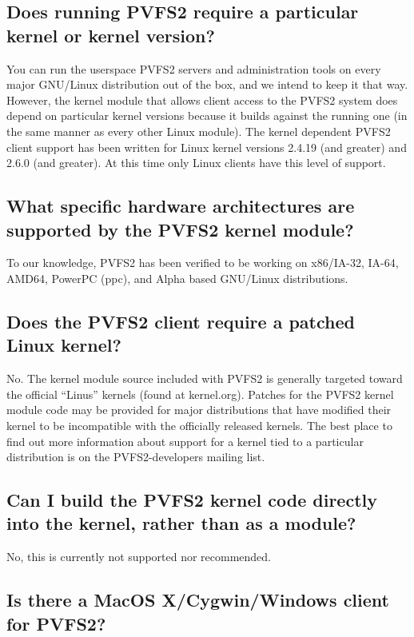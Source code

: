 \documentclass[11pt,letterpaper]{article}
\begin{document}
\subsection{Does running PVFS2 require a particular kernel or kernel
            version?}
\label{sec:kernel-version}

You can run the userspace PVFS2 servers and administration tools on
every major GNU/Linux distribution out of the box, and we intend to
keep it that way.
%
However, the kernel module that allows client access to the PVFS2 system
does depend on particular kernel versions because it builds against
the running one (in the same manner as every other Linux module).
The kernel dependent PVFS2 client support has been written for Linux
kernel versions 2.4.19 (and greater) and 2.6.0 (and greater).  At this
time only Linux clients have this level of support.

\subsection{What specific hardware architectures are supported by the
            PVFS2 kernel module?}
\label{sec:supported-hw}

To our knowledge, PVFS2 has been verified to be working on x86/IA-32,
IA-64, AMD64, PowerPC (ppc), and Alpha based GNU/Linux distributions.

\subsection{Does the PVFS2 client require a patched Linux kernel?}

No.  The kernel module source included with PVFS2 is generally
targeted toward the official ``Linus'' kernels (found at kernel.org).
Patches for the PVFS2 kernel module code may be provided for major
distributions that have modified their kernel to be incompatible with
the officially released kernels.  The best place to find out more
information about support for a kernel tied to a particular
distribution is on the PVFS2-developers mailing list.

\subsection{Can I build the PVFS2 kernel code directly into the kernel,
            rather than as a module?}

No, this is currently not supported nor recommended.

\subsection{Is there a MacOS X/Cygwin/Windows client for PVFS2?}
\end{document}
